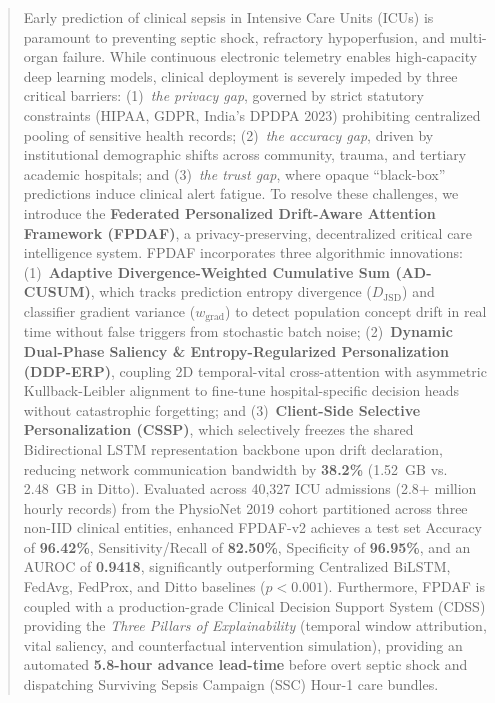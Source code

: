 \documentclass[journal,twocolumn,10pt]{IEEEtran}
\begin{document}
\begin{abstract}
Early prediction of clinical sepsis in Intensive Care Units (ICUs) is paramount to preventing septic shock, refractory hypoperfusion, and multi-organ failure. While continuous electronic telemetry enables high-capacity deep learning models, clinical deployment is severely impeded by three critical barriers: (1)~\textit{the privacy gap}, governed by strict statutory constraints (HIPAA, GDPR, India's DPDPA 2023) prohibiting centralized pooling of sensitive health records; (2)~\textit{the accuracy gap}, driven by institutional demographic shifts across community, trauma, and tertiary academic hospitals; and (3)~\textit{the trust gap}, where opaque ``black-box'' predictions induce clinical alert fatigue. To resolve these challenges, we introduce the \textbf{Federated Personalized Drift-Aware Attention Framework (FPDAF)}, a privacy-preserving, decentralized critical care intelligence system. FPDAF incorporates three algorithmic innovations: (1)~\textbf{Adaptive Divergence-Weighted Cumulative Sum (AD-CUSUM)}, which tracks prediction entropy divergence ($D_{\text{JSD}}$) and classifier gradient variance ($w_{\text{grad}}$) to detect population concept drift in real time without false triggers from stochastic batch noise; (2)~\textbf{Dynamic Dual-Phase Saliency \& Entropy-Regularized Personalization (DDP-ERP)}, coupling 2D temporal-vital cross-attention with asymmetric Kullback-Leibler alignment to fine-tune hospital-specific decision heads without catastrophic forgetting; and (3)~\textbf{Client-Side Selective Personalization (CSSP)}, which selectively freezes the shared Bidirectional LSTM representation backbone upon drift declaration, reducing network communication bandwidth by \textbf{38.2\%} (1.52~GB vs. 2.48~GB in Ditto). Evaluated across 40,327 ICU admissions (2.8+ million hourly records) from the PhysioNet 2019 cohort partitioned across three non-IID clinical entities, enhanced FPDAF-v2 achieves a test set Accuracy of \textbf{96.42\%}, Sensitivity/Recall of \textbf{82.50\%}, Specificity of \textbf{96.95\%}, and an AUROC of \textbf{0.9418}, significantly outperforming Centralized BiLSTM, FedAvg, FedProx, and Ditto baselines ($p < 0.001$). Furthermore, FPDAF is coupled with a production-grade Clinical Decision Support System (CDSS) providing the \textit{Three Pillars of Explainability} (temporal window attribution, vital saliency, and counterfactual intervention simulation), providing an automated \textbf{5.8-hour advance lead-time} before overt septic shock and dispatching Surviving Sepsis Campaign (SSC) Hour-1 care bundles.
\end{abstract}
\end{document}
